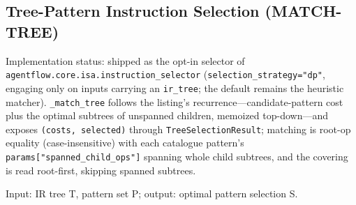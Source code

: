 \documentclass[
  11pt,
]{article}
\begin{document}
\subsection{Tree-Pattern Instruction Selection
(MATCH-TREE)}\label{tree-pattern-instruction-selection-match-tree}

Implementation status: shipped as the opt-in selector of
\texttt{agentflow.core.isa.instruction\_selector}
(\texttt{selection\_strategy="dp"}, engaging only on inputs carrying an
\texttt{ir\_tree}; the default remains the heuristic matcher).
\texttt{\_match\_tree} follows the listing's
recurrence---candidate-pattern cost plus the optimal subtrees of
unspanned children, memoized top-down---and exposes
\texttt{(costs,\ selected)} through \texttt{TreeSelectionResult};
matching is root-op equality (case-insensitive) with each catalogue
pattern's \texttt{params{[}"spanned\_child\_ops"{]}} spanning whole
child subtrees, and the covering is read root-first, skipping spanned
subtrees.

Input: IR tree T, pattern set P; output: optimal pattern selection S.
\end{document}
